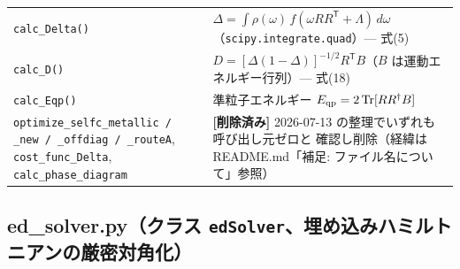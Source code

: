 \documentclass[11pt]{ltjsarticle}
\newcommand{\code}[1]{\texttt{#1}}
\begin{document}
\begin{longtable}{p{}p{}}
\code{calc\_Delta()} & $\Delta=\int\rho(\omega)\,f(\omega RR^{\mathsf T}+\Lambda)\,d\omega$
（\code{scipy.integrate.quad}）— 式(5) \\
\code{calc\_D()} & $D=[\Delta(1-\Delta)]^{-1/2}R^{\mathsf T}B$（$B$ は運動エネルギー行列）— 式(18) \\
\code{calc\_Eqp()} & 準粒子エネルギー $E_{\rm qp}=2\,\mathrm{Tr}[RR^\dagger B]$ \\
\midrule
\code{optimize\_selfc\_metallic / \_new / \_offdiag / \_routeA}, \code{cost\_func\_Delta},
\code{calc\_phase\_diagram} & \textbf{[削除済み]} 2026-07-13 の整理でいずれも呼び出し元ゼロと
確認し削除（経緯は README.md「補足: ファイル名について」参照）\\
\bottomrule
\end{longtable}

\subsection*{ed\_solver.py（クラス \code{edSolver}、埋め込みハミルトニアンの厳密対角化）}
\end{document}
